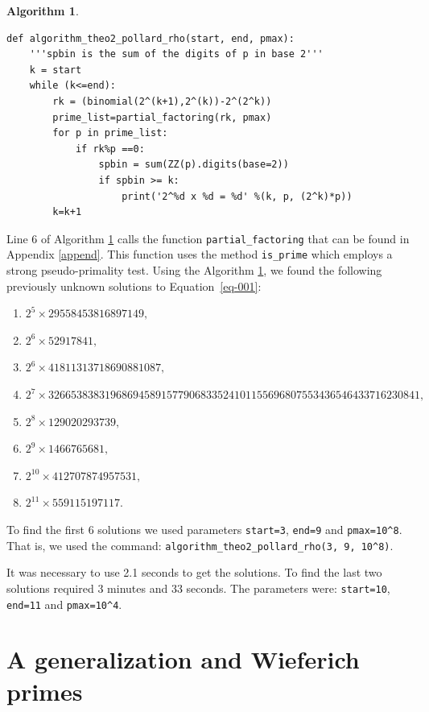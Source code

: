 \documentclass[11pt,a4paper]{article}
\newtheorem{algorithm}{Algorithm}[section]
\begin{document}
\begin{algorithm}\label{algo02} \rm \footnotesize
\mbox{ }
\begin{lstlisting} 
def algorithm_theo2_pollard_rho(start, end, pmax):
    '''spbin is the sum of the digits of p in base 2'''
    k = start
    while (k<=end):
        rk = (binomial(2^(k+1),2^(k))-2^(2^k))
        prime_list=partial_factoring(rk, pmax)
        for p in prime_list:
            if rk%p ==0:
                spbin = sum(ZZ(p).digits(base=2)) 
                if spbin >= k:
                    print('2^%d x %d = %d' %(k, p, (2^k)*p))
        k=k+1
\end{lstlisting} \normalsize
\end{algorithm}
Line 6 of Algorithm \ref{algo02} calls the function \verb|partial_factoring| that can be found in Appendix \ref{append}. This function uses the method \verb|is_prime| which employs a strong pseudo-primality test. 
Using the Algorithm \ref{algo02}, we found the following previously unknown solutions to Equation~\eqref{eq-001}:
\begin{enumerate}
\setlength\itemsep{-0.1em} 
    \item $2^5 \times 29558453816897149,$
    \item $2^6 \times 52917841,$
    \item $2^6 \times 41811313718690881087,$
    \item $2^7 \times 326653838319686945891577906833524101155696807553436546433716230841,$
    \item $2^8 \times 129020293739,$
    \item $2^9 \times 1466765681,$
    \item $2^{10} \times 412707874957531,$
    \item $2^{11} \times 559115197117.$
\end{enumerate}
To find the first 6 solutions we used parameters \verb|start=3|, \verb|end=9| and \verb|pmax=10^8|. That is, we used the command: \verb|algorithm_theo2_pollard_rho(3, 9, 10^8)|.

It was necessary to use 2.1 seconds to get the solutions. 
To find the last two solutions required 3 minutes and 33 seconds. The parameters were: \verb|start=10|, \verb|end=11| and \verb|pmax=10^4|.



\section{A generalization and Wieferich primes}
\end{document}

